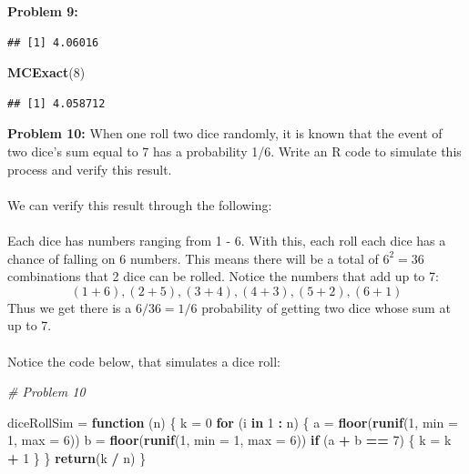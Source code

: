 \documentclass[11pt]{article}
\newenvironment{problem}[1]{\textbf{Problem #1:}}{\newpage}
\newenvironment{Shaded}{\begin{snugshade}}{\end{snugshade}}
\newcommand{\CommentTok}[1]{\textcolor[rgb]{0.56,0.35,0.01}{\textit{#1}}}
\newcommand{\ControlFlowTok}[1]{\textcolor[rgb]{0.13,0.29,0.53}{\textbf{#1}}}
\newcommand{\DataTypeTok}[1]{\textcolor[rgb]{0.13,0.29,0.53}{#1}}
\newcommand{\DecValTok}[1]{\textcolor[rgb]{0.00,0.00,0.81}{#1}}
\newcommand{\KeywordTok}[1]{\textcolor[rgb]{0.13,0.29,0.53}{\textbf{#1}}}
\newcommand{\NormalTok}[1]{#1}
\newcommand{\OperatorTok}[1]{\textcolor[rgb]{0.81,0.36,0.00}{\textbf{#1}}}
\newcommand{\StringTok}[1]{\textcolor[rgb]{0.31,0.60,0.02}{#1}}
\begin{document}
\begin{problem}{9}
\begin{verbatim}
## [1] 4.06016
\end{verbatim}

\begin{Shaded}
\begin{Highlighting}[]
\KeywordTok{MCExact}\NormalTok{(}\DecValTok{8}\NormalTok{)}
\end{Highlighting}
\end{Shaded}

\begin{verbatim}
## [1] 4.058712
\end{verbatim}
	
	\end{problem}

	\begin{problem}{10}
		When one roll two dice randomly, it is known that the event of two dice’s sum equal to 7 has a probability 1/6. Write an R code to simulate this process and verify this result.
		\\ \\
		We can verify this result through the following:
		\\ \\
		Each dice has numbers ranging from 1 - 6.  With this, each roll each dice has a chance of falling on 6 numbers.  This means there will be a total of $6^2 = 36$ combinations that 2 dice can be rolled.  Notice the numbers that add up to 7:
		\[(1 + 6), (2 + 5), (3 + 4), (4 + 3), (5 + 2), (6 + 1)\]
		Thus we get there is a $6/36 = 1/6$ probability of getting two dice whose sum at up to 7.
		\\ \\
		Notice the code below, that simulates a dice roll: \\
\begin{Shaded}
\begin{Highlighting}[]
\CommentTok{# Problem 10}

\NormalTok{diceRollSim =}\StringTok{ }\ControlFlowTok{function}\NormalTok{ (n) \{}
\NormalTok{  k =}\StringTok{ }\DecValTok{0}
  \ControlFlowTok{for}\NormalTok{ (i }\ControlFlowTok{in} \DecValTok{1} \OperatorTok{:}\StringTok{ }\NormalTok{n) \{}
\NormalTok{    a =}\StringTok{ }\KeywordTok{floor}\NormalTok{(}\KeywordTok{runif}\NormalTok{(}\DecValTok{1}\NormalTok{, }\DataTypeTok{min =} \DecValTok{1}\NormalTok{, }\DataTypeTok{max =} \DecValTok{6}\NormalTok{))}
\NormalTok{    b =}\StringTok{ }\KeywordTok{floor}\NormalTok{(}\KeywordTok{runif}\NormalTok{(}\DecValTok{1}\NormalTok{, }\DataTypeTok{min =} \DecValTok{1}\NormalTok{, }\DataTypeTok{max =} \DecValTok{6}\NormalTok{))}
  \ControlFlowTok{if}\NormalTok{ (a }\OperatorTok{+}\StringTok{ }\NormalTok{b }\OperatorTok{==}\StringTok{ }\DecValTok{7}\NormalTok{) \{}
\NormalTok{      k =}\StringTok{ }\NormalTok{k }\OperatorTok{+}\StringTok{ }\DecValTok{1}
\NormalTok{    \}}
\NormalTok{  \}}
  \KeywordTok{return}\NormalTok{(k }\OperatorTok{/}\StringTok{ }\NormalTok{n)}
\NormalTok{\}}


\end{Highlighting}
\end{Shaded}
\end{problem}
\end{document}
